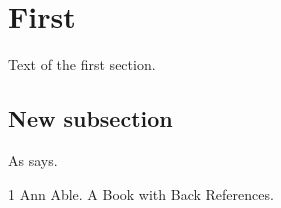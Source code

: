 \documentclass{article}
\begin{document}
\section{First}
\startcontents
{}
Text of the first section.
\subsection{New subsection}
As \cite{able} says.
\begin{thebibliography}{1}
 Ann Able. A Book with Back References.

\end{thebibliography}
\end{document}
